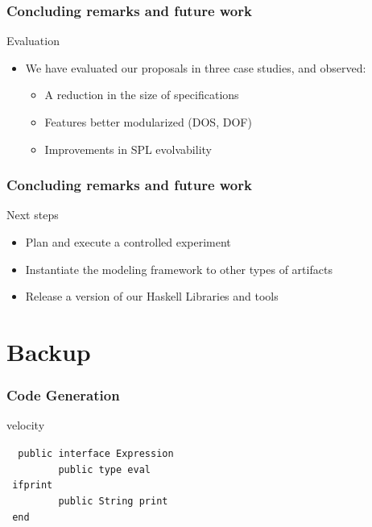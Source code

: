 \documentclass[xcolor=svgnames]{beamer}
\begin{document}
\begin{frame}
\frametitle{Concluding remarks and future work}
\begin{block}{Evaluation}
\begin{itemize}
  \item We have evaluated our proposals in three case studies, and observed: 
  \begin{itemize}
    \item A reduction in the size of specifications
    \item Features better modularized (DOS, DOF) 
    \item Improvements in SPL evolvability
  \end{itemize}  
\end{itemize}
\end{block}

\end{frame}

\begin{frame}
\frametitle{Concluding remarks and future work}
\begin{block}{Next steps}
\begin{itemize}
  \item Plan and execute a controlled experiment 
  \item Instantiate the modeling framework to other types of artifacts  
  \item Release a version of our Haskell Libraries and tools
\end{itemize}
\end{block}

\end{frame}

\begin{frame}
\titlepage
\end{frame}

\section*{Backup}

\begin{frame}[fragile]
\frametitle{Code Generation}

\begin{block}{velocity}
\end{block}
\begin{small}
\begin{tabbing}\tt
~public~interface~Expression~\\
\tt ~~~~~~~~~public~type~eval\\
\tt ~ifprint\\
\tt ~~~~~~~~~public~String~print\\
\tt ~end\\
\tt ~
\end{tabbing}
\end{small}
\end{frame}
\end{document}

